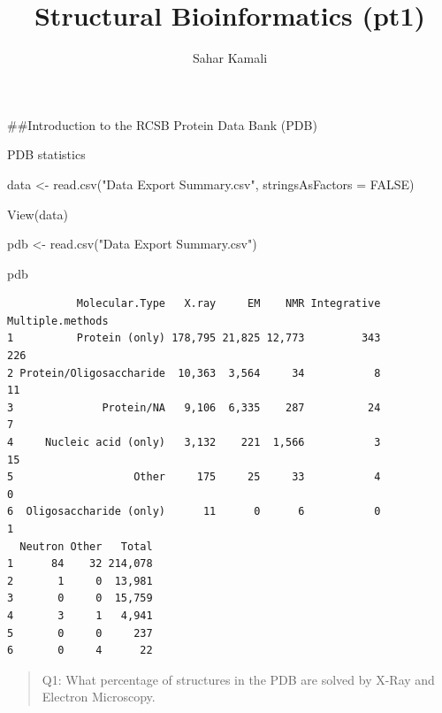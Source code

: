\documentclass[
  letterpaper,
  DIV=11,
  numbers=noendperiod]{scrartcl}
\title{Structural Bioinformatics (pt1)}
\author{Sahar Kamali}
\date{}
\newenvironment{Shaded}{\begin{snugshade}}{\end{snugshade}}
\newcommand{\AttributeTok}[1]{\textcolor[rgb]{0.40,0.45,0.13}{#1}}
\newcommand{\ConstantTok}[1]{\textcolor[rgb]{0.56,0.35,0.01}{#1}}
\newcommand{\FunctionTok}[1]{\textcolor[rgb]{0.28,0.35,0.67}{#1}}
\newcommand{\NormalTok}[1]{\textcolor[rgb]{0.00,0.23,0.31}{#1}}
\newcommand{\OtherTok}[1]{\textcolor[rgb]{0.00,0.23,0.31}{#1}}
\newcommand{\StringTok}[1]{\textcolor[rgb]{0.13,0.47,0.30}{#1}}
\begin{document}
\maketitle


\#\#Introduction to the RCSB Protein Data Bank (PDB)

PDB statistics

\begin{Shaded}
\begin{Highlighting}[]
\NormalTok{data }\OtherTok{\textless{}{-}} \FunctionTok{read.csv}\NormalTok{(}\StringTok{"Data Export Summary.csv"}\NormalTok{, }\AttributeTok{stringsAsFactors =} \ConstantTok{FALSE}\NormalTok{)}

\FunctionTok{View}\NormalTok{(data)}
\end{Highlighting}
\end{Shaded}

\begin{Shaded}
\begin{Highlighting}[]
\NormalTok{pdb }\OtherTok{\textless{}{-}} \FunctionTok{read.csv}\NormalTok{(}\StringTok{"Data Export Summary.csv"}\NormalTok{)}

\NormalTok{pdb}
\end{Highlighting}
\end{Shaded}

\begin{verbatim}
           Molecular.Type   X.ray     EM    NMR Integrative Multiple.methods
1          Protein (only) 178,795 21,825 12,773         343              226
2 Protein/Oligosaccharide  10,363  3,564     34           8               11
3              Protein/NA   9,106  6,335    287          24                7
4     Nucleic acid (only)   3,132    221  1,566           3               15
5                   Other     175     25     33           4                0
6  Oligosaccharide (only)      11      0      6           0                1
  Neutron Other   Total
1      84    32 214,078
2       1     0  13,981
3       0     0  15,759
4       3     1   4,941
5       0     0     237
6       0     4      22
\end{verbatim}

\begin{quote}
Q1: What percentage of structures in the PDB are solved by X-Ray and
Electron Microscopy.
\end{quote}
\end{document}
